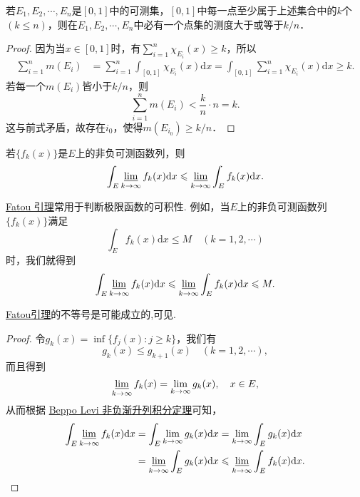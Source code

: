 \documentclass[../../main.tex]{subfiles}
\begin{document}
\begin{example}
若\(E_1, E_2, \cdots, E_n\)是\([0, 1]\)中的可测集，\([0, 1]\)中每一点至少属于上述集合中的\(k\)个\((k \leqslant n)\)，则在\(E_1, E_2, \cdots, E_n\)中必有一个点集的测度大于或等于\(k / n\)．
\end{example}
\begin{proof}
因为当\(x \in [0, 1]\)时，有\(\sum_{i = 1}^{n} \chi_{E_i}(x) \geqslant k\)，所以
\begin{align*}
\sum_{i = 1}^{n} m(E_i) &= \sum_{i = 1}^{n} \int_{[0, 1]} \chi_{E_i}(x) \mathrm{d}x = \int_{[0, 1]} \sum_{i = 1}^{n} \chi_{E_i}(x) \mathrm{d}x \geqslant k.
\end{align*}
若每一个\(m(E_i)\)皆小于\(k / n\)，则
\[
\sum_{i = 1}^{n} m(E_i) < \frac{k}{n} \cdot n = k.
\]
这与前式矛盾，故存在\(i_0\)，使得\(m(E_{i_0}) \geqslant k / n\)． 

\end{proof}

\begin{theorem}[Fatou引理]\label{lemma:Fatou引理}
若\(\{f_k(x)\}\)是\(E\)上的非负可测函数列，则
\begin{align*}
\int_E \varliminf_{k \to \infty} f_k(x) \mathrm{d}x \leqslant \varliminf_{k \to \infty} \int_E f_k(x) \mathrm{d}x. 
\end{align*}
\end{theorem}
\begin{note}
\hyperref[lemma:Fatou引理]{Fatou 引理}常用于判断极限函数的可积性. 例如，当\(E\)上的非负可测函数列\(\{f_k(x)\}\)满足
\[
\int_E f_k(x) \mathrm{d}x \leqslant M \quad (k = 1, 2, \cdots)
\]
时，我们就得到
\[
\int_E \varliminf_{k \to \infty} f_k(x) \mathrm{d}x \leqslant \varliminf_{k \to \infty} \int_E f_k(x) \mathrm{d}x\leqslant M.
\] 
\end{note}
\begin{remark}
\hyperref[lemma:Fatou引理]{Fatou引理}的不等号是可能成立的,可见.
\end{remark}
\begin{proof}
令\(g_k(x) = \inf\{f_j(x): j \geqslant k\}\)，我们有
\[
g_k(x) \leqslant g_{k + 1}(x) \quad (k = 1, 2, \cdots),
\]
而且得到
\[
\varliminf_{k \to \infty} f_k(x) = \lim_{k \to \infty} g_k(x), \quad x \in E,
\]
从而根据 \hyperref[theorem:Beppo Levi非负渐升列积分定理]{Beppo Levi 非负渐升列积分定理}可知，
\begin{align*}
\int_E \varliminf_{k \to \infty} f_k(x) \mathrm{d}x &= \int_E \lim_{k \to \infty} g_k(x) \mathrm{d}x = \lim_{k \to \infty} \int_E g_k(x) \mathrm{d}x \\
&= \varliminf_{k \to \infty} \int_E g_k(x) \mathrm{d}x \leqslant \varliminf_{k \to \infty} \int_E f_k(x) \mathrm{d}x.
\end{align*}

\end{proof}
\end{document}
